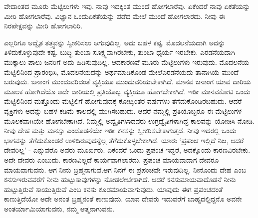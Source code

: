 ವೇದಾಂತದ ಮೂರು ಮೆಟ್ಟಿಲುಗಳು ಇವು. ನಾವು ಇದಕ್ಕಿಂತ ಮುಂದೆ ಹೋಗಲಾರೆವು. ಏಕೆಂದರೆ ನಾವು ಏಕತೆಯನ್ನು ಮೀರಿ ಹೋಗಲಾರೆವು. ವಿಜ್ಞಾನ ಒಂದು\break ಏಕತೆಯನ್ನು ಪಡೆದ ಮೇಲೆ ಮುಂದೆ ಹೋಗಲಾರದು. ನೀವು ಈ ನಿರಪೇಕ್ಷವನ್ನು ಮೀರಿ ಹೋಗಲಾರಿರಿ.

ಎಲ್ಲರಿಗೂ ಅದ್ವೈತ ತತ್ತ್ವವನ್ನು ಸ್ವೀಕರಿಸಲು ಆಗುವುದಿಲ್ಲ. ಅದು ಬಹಳ ಕಷ್ಟ. ಮೊದಲನೆಯದಾಗಿ ಅದನ್ನು ತಿಳಿದುಕೊಳ್ಳುವುದೇ ಕಷ್ಟ. ಬುದ್ಧಿ ತುಂಬಾ ಸೂಕ್ಷ್ಮವಾಗಿರಬೇಕು, ತುಂಬಾ ಧೈರ್ಯ ಇರಬೇಕು. ಎರಡನೆಯದಾಗಿ ಮುಕ್ಕಾಲು ಪಾಲು ಜನರಿಗೆ ಅದು ಹಿಡಿಸುವುದಿಲ್ಲ. ಆದಕಾರಣವೆ ಮೂರು ಮೆಟ್ಟಿಲುಗಳು ಇರುವುದು. ಮೊದಲನೆಯ ಮೆಟ್ಟಿಲಿನಿಂದ ಪ್ರಾರಂಭಿಸಿ, ಮೊದಲನೆಯದನ್ನು ಅರ್ಥಮಾಡಿಕೊಂಡ ಮೇಲೆ\break ಎರಡನೆಯದು ತಾನಾಗಿಯೆ ಮುಂದೆ ಬರುವುದು. ಜನಾಂಗ ಮುಂದುವರಿದಂತೆ ವ್ಯಕ್ತಿಯೂ ಮುಂದುವರಿಯಬೇಕಾಗಿದೆ. ಮಾನವ ಜನಾಂಗ ಯಾವ ದಾರಿಯ ಮೂಲಕ ಹೋಗಿದೆಯೊ ಅದೇ ದಾರಿಯಲ್ಲಿ ಪ್ರತಿಯೊಬ್ಬ ವ್ಯಕ್ತಿಯೂ ಹೋಗಬೇಕಾಗಿದೆ. ಇಡೀ ಮಾನವಕೋಟಿ ಒಂದು ಮೆಟ್ಟಿಲಿನಿಂದ ಮತ್ತೊಂದು ಮೆಟ್ಟಿಲಿಗೆ ಹೋಗುವುದಕ್ಕೆ ಕೋಟ್ಯಂತರ ವರ್ಷಗಳು ತೆಗೆದುಕೊಂಡಿರಬಹುದು. ಆದರೆ ವ್ಯಕ್ತಿಗಳು ಅದನ್ನು ಬಹಳ ಕಡಿಮೆ ಕಾಲದಲ್ಲಿ ಮುಗಿಸಬಹುದು. ಆದರೆ ನಮ್ಮಲ್ಲಿ ಪ್ರತಿಯೊಬ್ಬರೂ ಈ ಮೆಟ್ಟಿಲುಗಳ ಮೂಲಕವಾಗಿಯೇ ಹೋಗಬೇಕಾಗಿದೆ. ನಿಮ್ಮಲ್ಲಿ ಅದ್ವೈತಿಗಳಾದವರು ಉಗ್ರದ್ವೈತಿಗಳಾಗಿದ್ದ ಕಾಲವನ್ನು ಯೋಚಿಸಿ ನೋಡಿ. ನೀವು ದೇಹ ಮತ್ತು ಮನಸ್ಸು ಎಂದೊಡನೆಯೇ ಇಡೀ ಕನಸನ್ನು ಸ್ವೀಕರಿಸಬೇಕಾಗುತ್ತದೆ. ನೀವು ಇದರಲ್ಲಿ ಒಂದು ಭಾಗವನ್ನು ತೆಗೆದುಕೊಂಡರೆ ಉಳಿದಿರುವುದನ್ನೆಲ್ಲ ತೆಗೆದುಕೊಳ್ಳಬೇಕಾಗಿದೆ. ಯಾರು ‘ಪ್ರಪಂಚ ಇಲ್ಲಿದೆ ನಿಜ, ಆದರೆ ದೇವರಿಲ್ಲ’ - ಎನ್ನುವರೊ ಅವರು ಮೂರ್ಖರು. ಏಕೆಂದರೆ ಒಂದು ಪ್ರಪಂಚ ಇದ್ದರೆ, ಅದಕ್ಕೊಂದು ಕಾರಣವಿರಬೇಕು. ಅದೇ ದೇವರು ಎಂಬುದು. ಕಾರಣವಿಲ್ಲದೆ ಕಾರ್ಯವಾಗಲಾರದು. ಪ್ರಪಂಚ ಮಾಯವಾದಾಗ ದೇವರೂ ಮಾಯವಾಗುವನು. ಆಗ ನೀನು ಬ್ರಹ್ಮನಾಗುವೆ.\break ಆಗ ನಿನಗೆ ಈ ಪ್ರಪಂಚವೇ ಇರುವುದಿಲ್ಲ. ನೀನೊಂದು ದೇಹ ಎಂಬ ಕನಸು\break ಇರುವವರೆಗೆ ನೀನು ಹುಟ್ಟುಸಾವುಗಳನ್ನು ನೋಡಲೇಬೇಕಾಗಿದೆ. ಆದರೆ ಕನಸು\break ಮಾಯವಾದೊಡನೆ ನೀನು ಹುಟ್ಟುತ್ತಿರುವೆ ಸಾಯುತ್ತಿರುವೆ ಎಂಬ ಕನಸು ಕೂಡ\break ಮಾಯವಾಗುವುದು. ಯಾವುದು ಈಗ ಪ್ರಪಂಚದಂತೆ ಕಾಣುತ್ತಿದೆಯೋ ಅದೇ ಅನಂತ ಬ್ರಹ್ಮನಂತೆ ಕಾಣುವುದು. ಯಾವ ದೇವರು ಇದುವರೆಗೆ ಬಾಹ್ಯದಲ್ಲಿದ್ದನೊ ಅವನೇ ಅಂತರ್ಯಾಮಿಯಾಗುವನು, ನಮ್ಮ ಆತ್ಮನಾಗುವನು.

